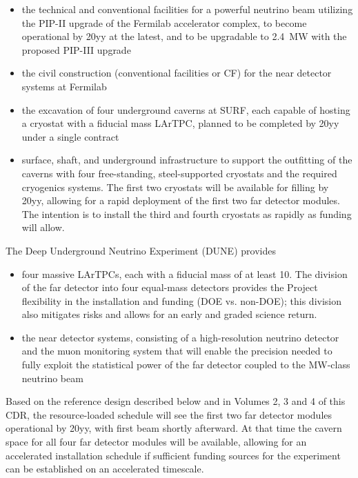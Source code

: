\begin{itemize}

\item  the  technical and conventional facilities for a powerful  neutrino beam utilizing the PIP-II upgrade of the Fermilab accelerator 
complex, to become operational by 20yy %
at the latest, and to be upgradable to \SI{2.4}{\MW} with the proposed 
PIP-III upgrade

\item  the civil construction (conventional facilities or CF) for the near detector systems at Fermilab 

\item the excavation of four underground caverns at SURF, each capable of hosting a cryostat 
with a  fiducial mass LArTPC, %
planned to be completed 
by 20yy %
under a single contract

\item surface, shaft, and underground infrastructure to support 
the outfitting of the caverns with four free-standing, steel-supported cryostats 
and the required cryogenics systems. The first two cryostats will be available for filling by
20yy, %
allowing for a rapid deployment of the first two  far detector modules. 
The intention is to install the third and fourth cryostats as rapidly as funding will 
allow.

\end{itemize}

The Deep Underground Neutrino Experiment (DUNE) provides
\begin{itemize}

\item four massive LArTPCs, each with a fiducial mass of at least \SI{10}{\kt}. The division of 
the far detector into four equal-mass detectors provides the Project flexibility 
in the installation and funding (DOE vs. non-DOE); this division also mitigates risks and allows for an early and graded science return.

\item the near detector systems, consisting of a high-resolution neutrino detector 
and the muon monitoring system that will enable %
the precision %
needed to fully 
exploit the statistical power of the %
far detector coupled to the %
MW-class 
neutrino beam
\end{itemize}


Based on the reference design described below and in Volumes 2, 3 and 4 of this %
CDR, the resource-loaded schedule will see the first two  far detector modules 
operational by 20yy, %
with first beam shortly afterward. At that time the cavern 
space for all four  far detector modules will be available, allowing for 
an accelerated installation schedule if sufficient funding sources for
the experiment can be established on an accelerated timescale.  

